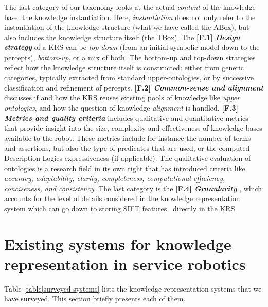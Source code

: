 \documentclass[journal]{IEEEtran}
\newcommand{\taxon}[2]{%
    \textbf{[#1] \emph{#2}}
}
\begin{document}
The last category of our taxonomy looks at the actual \emph{content} of the
knowledge base: the knowledge instantiation. Here, \emph{instantiation} does
not only refer to the instantiation of the knowledge structure (what we have
called the ABox), but also includes the knowledge structure itself (the TBox).
% 
The \taxon{F.1}{Design strategy} of a KRS can be \emph{top-down} (from an
initial symbolic model down to the percepts), \emph{bottom-up}, or a mix of
both. The bottom-up and top-down strategies reflect how the knowledge structure
itself is constructed: either from generic categories, typically extracted from
standard upper-ontologies, or by successive classification and refinement of
percepts.
% 
\taxon{F.2}{Common-sense and alignment} discusses if and how the KRS reuses
existing pools of knowledge like \emph{upper ontologies}, and how the question
of knowledge \emph{alignment} is handled. \taxon{F.3}{Metrics and quality
criteria} includes qualitative and quantitative metrics that provide insight 
into the size, complexity and effectiveness of knowledge bases available to the 
robot. These metrics include for instance the number of terms and assertions, 
but also the type of predicates that are used, or the computed Description Logics
expressiveness (if applicable). The qualitative evaluation of ontologies is a
research field in its own right that has introduced criteria like \emph{accuracy,
adaptability, clarity, completeness, computational efficiency, conciseness, and
consistency}. The last category is the \taxon{F.4}{Granularity}, which accounts 
for the level of details considered in the knowledge representation system 
which can go down to storing SIFT features~\cite{Suh2007} directly in the KRS.



\section{Existing systems for knowledge representation in service robotics}
\label{sect|surveyed-systems}

Table \ref{table|surveyed-systems} lists the knowledge representation
systems that we have surveyed. This section briefly presents each of them.
\end{document}
